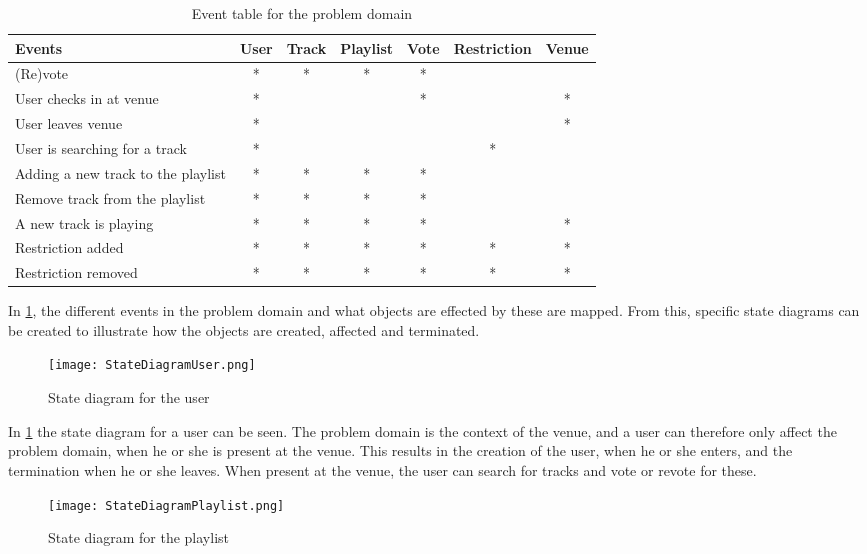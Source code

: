 \begin{table}[h]
	\begin{tabular}{|l|c|c|c|c|c|c|}
		\hline 
    \textbf{Events} & User & Track & Playlist & Vote & Restriction & Venue\\ \hline
    (Re)vote & * & * & * & * &   &   \\ \hline
    User checks in at venue & * &   &   & * &   & * \\ \hline
    User leaves venue & * &   &   &   &   & * \\ \hline
    User is searching for a track & * &   &   &   & * &   \\ \hline
    Adding a new track to the playlist & * & * & * & * &   &   \\ \hline
    Remove track from the playlist & * & * & * & * &   &   \\ \hline
    A new track is playing & * & * & * & * &   & * \\ \hline
    Restriction added & * & * & * & * & * & * \\ \hline
    Restriction removed & * & * & * & * & * & * \\ \hline
	\end{tabular}
	\caption{Event table for the problem domain}
	\label{eventtable}
\end{table}


In \cref{eventtable}, the different events in the problem domain and what objects are effected by these are mapped. From this, specific state diagrams can be created to illustrate how the objects are created, affected and terminated.

\begin{figure}[h]
  \centering
  \texttt{[image: StateDiagramUser.png]}
  \caption{State diagram for the user}\label{fig:StateDiagramUser}
\end{figure}

In \cref{fig:StateDiagramUser} the state diagram for a user can be seen. The problem domain is the context of the venue, and a user can therefore only affect the problem domain, when he or she is present at the venue. This results in the creation of the user, when he or she enters, and the termination when he or she leaves. When present at the venue, the user can search for tracks and vote or revote for these.

\begin{figure}[h!]
  \centering
  \texttt{[image: StateDiagramPlaylist.png]}
  \caption{State diagram for the playlist}\label{fig:StateDiagramPlaylist}
\end{figure}

